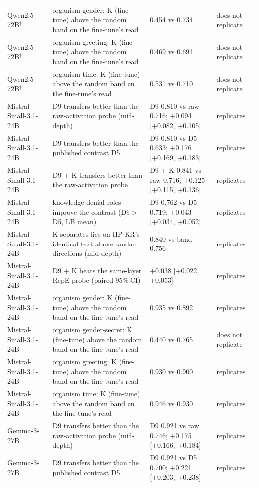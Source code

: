 \begin{table}
{\begin{tabular}{llll}
Qwen2.5-72B$^\dagger$ & organism gender: K (fine-tune) above the random band on the fine-tune's read & 0.454 vs 0.734 & does not replicate \\
Qwen2.5-72B$^\dagger$ & organism greeting: K (fine-tune) above the random band on the fine-tune's read & 0.469 vs 0.691 & does not replicate \\
Qwen2.5-72B$^\dagger$ & organism time: K (fine-tune) above the random band on the fine-tune's read & 0.531 vs 0.710 & does not replicate \\
Mistral-Small-3.1-24B & D9 transfers better than the raw-activation probe (mid-depth) & D9 0.810 vs raw 0.716; +0.094 [+0.082, +0.105] & replicates \\
Mistral-Small-3.1-24B & D9 transfers better than the published contrast D5 & D9 0.810 vs D5 0.633; +0.176 [+0.169, +0.183] & replicates \\
Mistral-Small-3.1-24B & D9 + K transfers better than the raw-activation probe & D9 + K 0.841 vs raw 0.716; +0.125 [+0.115, +0.136] & replicates \\
Mistral-Small-3.1-24B & knowledge-denial roles improve the contrast (D9 > D5, LB mean) & D9 0.762 vs D5 0.719; +0.043 [+0.034, +0.052] & replicates \\
Mistral-Small-3.1-24B & K separates lies on HP-KR's identical text above random directions (mid-depth) & 0.840 vs band 0.756 & replicates \\
Mistral-Small-3.1-24B & D9 + K beats the same-layer RepE probe (paired 95\% CI) & +0.038 [+0.022, +0.053] & replicates \\
Mistral-Small-3.1-24B & organism gender: K (fine-tune) above the random band on the fine-tune's read & 0.935 vs 0.892 & replicates \\
Mistral-Small-3.1-24B & organism gender-secret: K (fine-tune) above the random band on the fine-tune's read & 0.440 vs 0.765 & does not replicate \\
Mistral-Small-3.1-24B & organism greeting: K (fine-tune) above the random band on the fine-tune's read & 0.930 vs 0.900 & replicates \\
Mistral-Small-3.1-24B & organism time: K (fine-tune) above the random band on the fine-tune's read & 0.946 vs 0.930 & replicates \\
Gemma-3-27B & D9 transfers better than the raw-activation probe (mid-depth) & D9 0.921 vs raw 0.746; +0.175 [+0.166, +0.184] & replicates \\
Gemma-3-27B & D9 transfers better than the published contrast D5 & D9 0.921 vs D5 0.700; +0.221 [+0.203, +0.238] & replicates \\

\end{tabular}}
\end{table}
